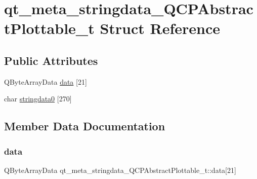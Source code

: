 \hypertarget{structqt__meta__stringdata__QCPAbstractPlottable__t}{}\section{qt\+\_\+meta\+\_\+stringdata\+\_\+\+Q\+C\+P\+Abstract\+Plottable\+\_\+t Struct Reference}
\label{structqt__meta__stringdata__QCPAbstractPlottable__t}
\subsection*{Public Attributes}
\begin{DoxyCompactItemize}
\item 
Q\+Byte\+Array\+Data \mbox{\hyperlink{structqt__meta__stringdata__QCPAbstractPlottable__t_aaf0620f4cc407349bff54eddf41fef33}{data}} \mbox{[}21\mbox{]}
\item 
char \mbox{\hyperlink{structqt__meta__stringdata__QCPAbstractPlottable__t_a397cb51ceb93b62e1fb7a828768255e4}{stringdata0}} \mbox{[}270\mbox{]}
\end{DoxyCompactItemize}


\subsection{Member Data Documentation}
\mbox{\label{structqt__meta__stringdata__QCPAbstractPlottable__t_aaf0620f4cc407349bff54eddf41fef33}} 
\subsubsection{\texorpdfstring{data}{data}}
{\footnotesize\ttfamily Q\+Byte\+Array\+Data qt\+\_\+meta\+\_\+stringdata\+\_\+\+Q\+C\+P\+Abstract\+Plottable\+\_\+t\+::data\mbox{[}21\mbox{]}}

\mbox{\label{structqt__meta__stringdata__QCPAbstractPlottable__t_a397cb51ceb93b62e1fb7a828768255e4}} 
